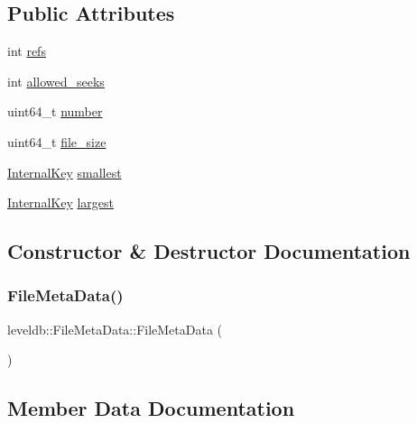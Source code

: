 \subsection*{Public Attributes}
\begin{DoxyCompactItemize}
\item 
int \mbox{\hyperlink{structleveldb_1_1_file_meta_data_a199e4ba2167c8facad8bd41269982935}{refs}}
\item 
int \mbox{\hyperlink{structleveldb_1_1_file_meta_data_a63f9a0149290c7b22bbc871da6b4f619}{allowed\+\_\+seeks}}
\item 
uint64\+\_\+t \mbox{\hyperlink{structleveldb_1_1_file_meta_data_adc63bac3e06fd4387ebb9f085fc88fe7}{number}}
\item 
uint64\+\_\+t \mbox{\hyperlink{structleveldb_1_1_file_meta_data_a778ea9c773ad4fdfe4408eecaae754f7}{file\+\_\+size}}
\item 
\mbox{\hyperlink{classleveldb_1_1_internal_key}{Internal\+Key}} \mbox{\hyperlink{structleveldb_1_1_file_meta_data_a9e5e5c149495aede836ac637cd89269f}{smallest}}
\item 
\mbox{\hyperlink{classleveldb_1_1_internal_key}{Internal\+Key}} \mbox{\hyperlink{structleveldb_1_1_file_meta_data_a410718ba1868392b298d05a774dd07d1}{largest}}
\end{DoxyCompactItemize}


\subsection{Constructor \& Destructor Documentation}
\mbox{\label{structleveldb_1_1_file_meta_data_ab809d499cd560df58cc5c529bb69980a}} 
\subsubsection{\texorpdfstring{FileMetaData()}{FileMetaData()}}
{\footnotesize\ttfamily leveldb\+::\+File\+Meta\+Data\+::\+File\+Meta\+Data (\begin{DoxyParamCaption}{ }\end{DoxyParamCaption})\hspace{0.3cm}{\ttfamily [inline]}}



\subsection{Member Data Documentation}
\mbox{\label{structleveldb_1_1_file_meta_data_a63f9a0149290c7b22bbc871da6b4f619}} 
